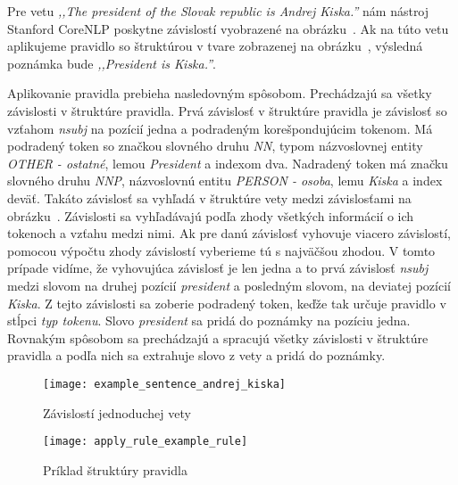 Pre vetu \textit{,,The president of the Slovak republic is Andrej Kiska.''} nám nástroj Stanford CoreNLP poskytne závislostí vyobrazené na obrázku~. Ak na túto vetu aplikujeme pravidlo so štruktúrou v tvare zobrazenej na obrázku~, výsledná poznámka bude \textit{,,President is Kiska.''}. 

Aplikovanie pravidla prebieha nasledovným spôsobom. Prechádzajú sa všetky závislosti v štruktúre pravidla. Prvá závislosť v štruktúre pravidla je závislosť so vzťahom \textit{nsubj} na pozícií jedna a podradeným korešpondujúcim tokenom. Má podradený token so značkou slovného druhu \textit{NN}, typom názvoslovnej entity \textit{OTHER - ostatné}, lemou \textit{President} a indexom dva. Nadradený token má značku slovného druhu \textit{NNP}, názvoslovnú entitu \textit{PERSON - osoba}, lemu \textit{Kiska} a index deväť. Takáto závislosť sa vyhľadá v štruktúre vety medzi závislosťami na obrázku~. Závislosti sa vyhľadávajú podľa zhody všetkých informácií o ich tokenoch a vzťahu medzi nimi. Ak pre danú závislosť vyhovuje viacero závislostí, pomocou výpočtu zhody závislostí vyberieme tú s najväčšou zhodou. V tomto prípade vidíme, že vyhovujúca závislosť je len jedna a to prvá závislosť \textit{nsubj} medzi slovom na druhej pozícií \textit{president} a posledným slovom, na deviatej pozícií \textit{Kiska}. Z tejto závislosti sa zoberie podradený token, keďže tak určuje pravidlo v stĺpci \textit{typ tokenu}. Slovo \textit{president} sa pridá do poznámky na pozíciu jedna. Rovnakým spôsobom sa prechádzajú a spracujú všetky závislosti v štruktúre pravidla a podľa nich sa extrahuje slovo z vety a pridá do poznámky.

\begin{figure}[H]
	\begin{center}\texttt{[image: example\_sentence\_andrej\_kiska]}\end{center}
	\caption[Závislostí jednoduchej vety]{Závislostí jednoduchej vety}\label{fig:example_sentence_andrej_kiska}
\end{figure}

\begin{figure}[H]
	\begin{center}\texttt{[image: apply\_rule\_example\_rule]}\end{center}
	\caption[Príklad štruktúry pravidla]{Príklad štruktúry pravidla}\label{fig:apply_rule_example_rule}
\end{figure}

